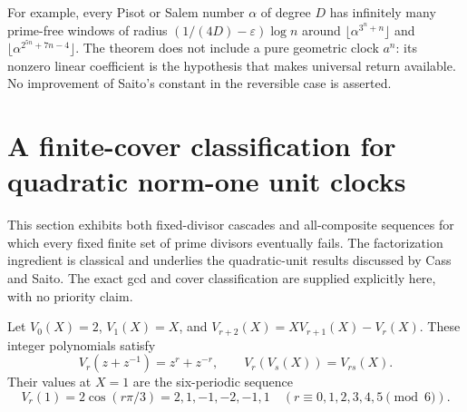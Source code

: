 \documentclass[11pt,a4paper]{article}
\theoremstyle{definition}
\theoremstyle{remark}
\numberwithin{equation}{section}
\begin{document}
For example, every Pisot or Salem number $\alpha$ of degree $D$ has
infinitely many prime-free windows of radius
$(1/(4D)-\varepsilon)\log n$ around
$\lfloor\alpha^{3^n+n}\rfloor$ and
$\lfloor\alpha^{2^{5n}+7n-4}\rfloor$.
The theorem does not include a pure geometric clock $a^n$: its nonzero
linear coefficient is the hypothesis that makes universal return
available.  No improvement of Saito's constant in the reversible case
is asserted.

\section{A finite-cover classification for quadratic norm-one unit clocks}
\label{f13:sec:quadratic-clock-cover}

This section exhibits both fixed-divisor cascades and all-composite
sequences for which every fixed finite set of prime divisors eventually
fails.  The factorization ingredient is classical and underlies the
quadratic-unit results discussed by Cass and Saito.  The exact gcd and
cover classification are supplied explicitly here, with no priority
claim.

Let $V_0(X)=2$, $V_1(X)=X$, and
$V_{r+2}(X)=XV_{r+1}(X)-V_r(X)$.  These integer polynomials satisfy
\[
 V_r(z+z^{-1})=z^r+z^{-r},\qquad
 V_r(V_s(X))=V_{rs}(X).
\]
Their values at $X=1$ are the six-periodic sequence
\begin{equation}\label{f13:eq:chebyshev-at-one}
 V_r(1)=2\cos(r\pi/3)=2,1,-1,-2,-1,1
 \quad(r\equiv0,1,2,3,4,5\pmod6).
\end{equation}
\end{document}
